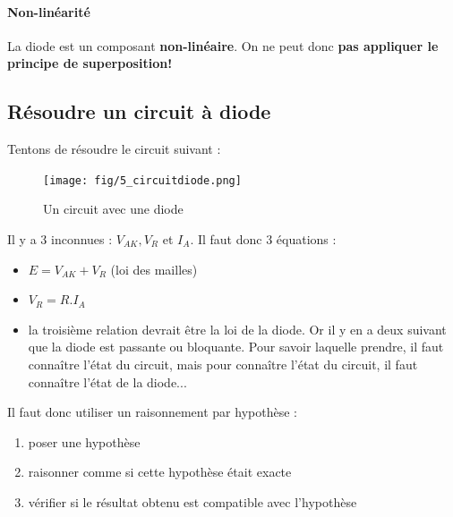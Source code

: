 \documentclass[a4paper]{article}
\begin{document}
    \paragraph{Non-linéarité} La diode est un composant \textbf{non-linéaire}.
    On ne peut donc \textbf{pas appliquer le principe de superposition!}

    \subsection{Résoudre un circuit à diode}
    Tentons de résoudre le circuit suivant :
    \begin{figure}[H]
        \begin{center}
            \texttt{[image: fig/5\_circuitdiode.png]}
            \caption{Un circuit avec une diode}
            \label{fig:5_circuitdiode}
        \end{center}
    \end{figure}
    Il y a 3 inconnues : $V_{AK}, V_R$ et $I_A$. Il faut donc 3 équations :
    \begin{itemize}
        \item $E = V_{AK}+V_R$ (loi des mailles)
        \item $V_R = R.I_A$
        \item la troisième relation devrait être la loi de la diode. Or il y en a 
        deux suivant que la diode est passante ou bloquante. Pour savoir laquelle
        prendre, il faut connaître l'état du circuit, mais pour connaître l'état
        du circuit, il faut connaître l'état de la diode...
    \end{itemize}

    Il faut donc utiliser un raisonnement par hypothèse :
    \begin{enumerate}
        \item poser une hypothèse
        \item raisonner comme si cette hypothèse était exacte
        \item vérifier si le résultat obtenu est compatible avec l'hypothèse
    \end{enumerate}
\end{document}
